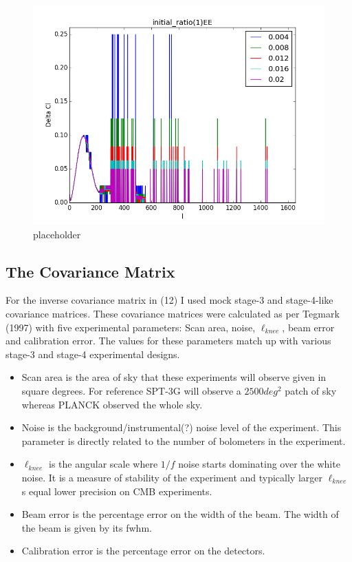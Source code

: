 \begin{figure}
\centering
\includegraphics[scale=0.75]{images/diffs/reez.png}
\caption{placeholder}
\end{figure}

\subsection{The Covariance Matrix}

For the inverse covariance matrix in (12) I used mock stage-3 and stage-4-like covariance matrices. These covariance matrices were calculated as per Tegmark (1997) \cite{Tegmark:1997vs} with five experimental parameters: Scan area, noise, $\ell_{knee}$, beam error and calibration error. The values for these parameters match up with various stage-3 and stage-4 experimental designs.
\begin{itemize}
\item Scan area is the area of sky that these experiments will observe given in square degrees. For reference SPT-3G will observe a $2500 deg^{2}$ patch of sky whereas PLANCK observed the whole sky.

\item Noise is the background/instrumental(?) noise level of the experiment. This parameter is directly related to the number of bolometers in the experiment.

\item $\ell_{knee}$ is the angular scale where $1/f$ noise starts dominating over the white noise. It is a measure of stability of the experiment and typically larger $\ell_{knee}$s equal lower precision on CMB experiments.

\item Beam error is the percentage error on the width of the beam. The width of the beam is given by its fwhm.

\item Calibration error is the percentage error on the detectors. 
\end{itemize}

